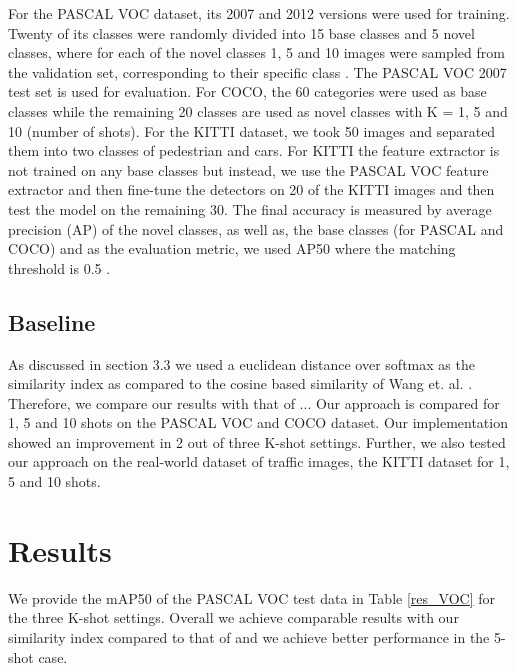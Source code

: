 \documentclass{article}
\begin{document}
For the PASCAL VOC dataset, its 2007 and 2012 versions were used for training. Twenty of its classes were randomly divided into 15 base classes and 5 novel classes, where for each of the novel classes 1,  5 and 10 images were sampled from the validation set, corresponding to their specific class \cite{wang2020frustratingly}. The PASCAL VOC 2007 test set is used for evaluation. For COCO, the 60 categories were used as base classes while the remaining 20 classes are used as novel classes with  K = 1, 5 and 10 (number of shots). For the KITTI dataset, we took 50 images and separated them into two classes of pedestrian and cars. For KITTI the feature extractor is not trained on any base classes but instead, we use the PASCAL VOC feature extractor and then fine-tune the detectors on 20 of the KITTI images and then test the model on the remaining 30. The final accuracy is measured by average precision (AP) of the novel classes, as well as, the base classes (for PASCAL and COCO)  and as the evaluation metric, we used AP50 where the matching threshold is 0.5 \cite{wang2020frustratingly}.

\subsection{Baseline}
As discussed in section 3.3 we used a euclidean distance over softmax as the similarity index as compared to the cosine based similarity of Wang et. al. \cite{wang2020frustratingly}. Therefore, we compare our results with that of \cite{wang2020frustratingly}... Our approach is compared for 1, 5 and 10 shots on the PASCAL VOC and COCO dataset. Our implementation showed an improvement in 2 out of three K-shot settings. Further, we also tested our approach on the real-world dataset of traffic images, the KITTI dataset for 1, 5 and 10 shots.  

\section{Results}

We provide the mAP50 of the PASCAL VOC test data in Table \ref{res_VOC} for the three K-shot settings. Overall we achieve comparable results with our similarity index compared to that of \cite{wang2020frustratingly} and we achieve better performance in the 5-shot case. 
\end{document}
